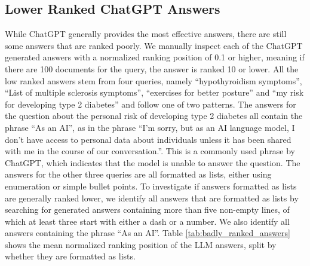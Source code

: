 \subsection{Lower Ranked ChatGPT Answers}
While ChatGPT generally provides the most effective answers, there are still some answers that are ranked poorly.
We manually inspect each of the ChatGPT generated answers with a normalized ranking position of 0.1 or higher, meaning if there are 100 documents for the query, the answer is ranked 10 or lower.
All the low ranked answers stem from four queries, namely ``hypothyroidism symptoms'', ``List of multiple sclerosis symptoms'',  ``exercises for better posture'' and ``my risk for developing type 2 diabetes'' and follow one of two patterns.
The answers for the question about the personal risk of developing type 2 diabetes all contain the phrase ``As an AI'', as in the phrase ``I'm sorry, but as an AI language model, I don't have access to personal data about individuals unless it has been shared with me in the course of our conversation.''.
This is a commonly used phrase by ChatGPT, which indicates that the model is unable to answer the question.
The answers for the other three queries are all formatted as lists, either using enumeration or simple bullet points.
To investigate if answers formatted as lists are generally ranked lower, we identify all answers that are formatted as lists by searching for generated answers containing more than five non-empty lines, of which at least three start with either a dash or a number.
We also identify all answers containing the phrase ``As an AI''.
Table \ref{tab:badly_ranked_answers} shows the mean normalized ranking position of the LLM answers, split by whether they are formatted as lists.
